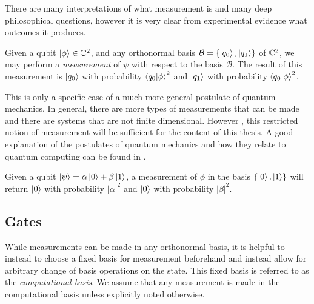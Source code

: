     



        

        There are many interpretations of what measurement is and many deep philosophical questions, however it is 
        very clear from experimental evidence what outcomes it produces.
               
        

        \begin{postulate}
            Given a qubit $\ket{\phi} \in \mathbb{C}^{2}$, and any orthonormal basis $ \mathcal{B} = \{\ket{q_0}, \ket{q_1 
            }\}$ of $ \mathbb{C}^2$, we may perform a \emph{measurement} of $\psi$ with respect to the basis $\mathcal{B}$.  
            The result of this measurement is $\ket{q_0}$ with probability $\braket{q_0 | \phi }^2$ and $\ket{q_1}$ 
            with probability $\braket{q_0 | \phi }^2$.
        \end{postulate}
        
        This is only a specific case of a much more general postulate of quantum mechanics. In general, there are 
        more types of measurements that can be made and there are systems that are not finite dimensional.  However 
        , this restricted notion of measurement will be sufficient for the content of this thesis. A good 
        explanation of the postulates of quantum mechanics and how they relate to quantum computing can be found in 
        \cite{Nielsen&Chuang}.

        \begin{example}
            Given a qubit $\ket{\psi} = \alpha\ket{0} + \beta\ket{1}$, a measurement of $\phi$ in the basis $\{ 
            \ket{0}, \ket{1}\}$ will return $\ket{0}$ with probability $ | \alpha |^2$  and $\ket{0}$ with 
            probability
            $ |\beta|^2 $.
        \end{example}

        
    
\subsection{Gates}

        While measurements can be made in any orthonormal basis, it is helpful to instead to choose a fixed basis 
        for measurement beforehand and instead allow for arbitrary change of basis operations on the state.  This 
        fixed basis is referred to as the \emph{computational basis}.  We assume that any measurement is made in 
        the computational basis unless explicitly noted otherwise.

